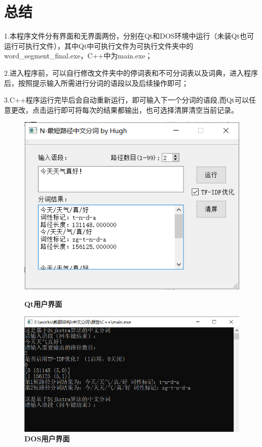 \documentclass[UTF8]{ctexart}
\begin{document}
\section{总结}
	1.本程序文件分有界面和无界面两份，分别在Qt和DOS环境中运行（未装Qt也可运行可执行文件），其中Qt中可执行文件为可执行文件夹中的word\_segment\_final.exe，C++中为main.exe；\par
	2.进入程序前，可以自行修改文件夹中的停词表和不可分词表以及词典，进入程序后，按照提示输入所需进行分词的语段以及后续操作即可；\par
3.C++程序运行完毕后会自动重新运行，即可输入下一个分词的语段,而Qt可以任意更改，点击运行即可将每次的结果都输出，也可选择清屏清空当前记录。\par
\begin{figure}[H]
\centerline{
\includegraphics[scale = .8]{ui.png}
}
\caption{\textbf{Qt用户界面}}
\centerline{
\includegraphics[scale = .7]{ui2.png}
}
\caption{\textbf{DOS用户界面}}
\end{figure}
\newpage
\end{document}
